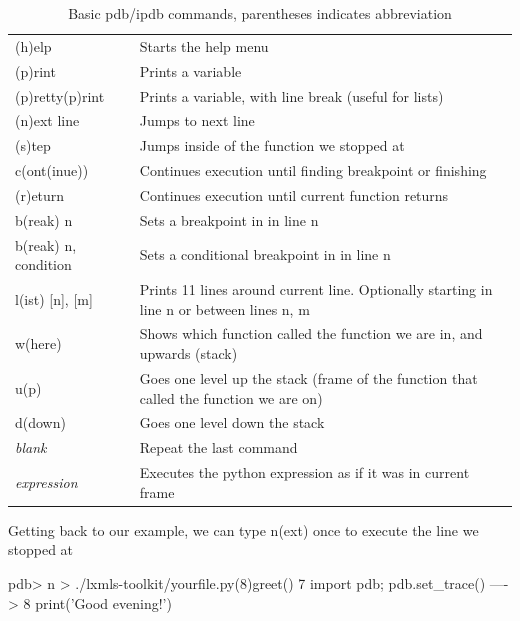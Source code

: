 \begin{table}[!h]
\begin{center}
\begin{tabular}{|l|l|}
\hline
(h)elp           & Starts the help menu\\
(p)rint          & Prints a variable\\
(p)retty(p)rint	 & Prints a variable, with line break (useful for lists)\\
\hline
(n)ext line      & Jumps to next line\\ 
(s)tep           & Jumps inside of the function we stopped at\\
c(ont(inue))     & Continues execution until finding breakpoint or finishing\\
(r)eturn         & Continues execution until current function returns\\
b(reak) n        & Sets a breakpoint in in line n\\
b(reak) n, condition  & Sets a conditional breakpoint in in line n\\
\hline
l(ist) [n], [m]  & Prints 11 lines around current line. Optionally starting in line n or between lines n, m\\
w(here)          & Shows which function called the function we are in, and upwards (stack)\\
u(p)             & Goes one level up the stack (frame of the function that called the function we are on)\\
d(down)          & Goes one level down the stack\\
\hline
\textit{blank}          & Repeat the last command\\ 
\textit{expression}     & Executes the python expression as if it was in current frame\\
\hline
\end{tabular}
\end{center}
\caption{\label{tb::pdbbasiccommands}Basic pdb/ipdb commands, parentheses indicates abbreviation}
\end{table}

\noindent Getting back to our example, we can type n(ext) once to execute the line we
stopped at

\begin{python}
pdb> n
> ./lxmls-toolkit/yourfile.py(8)greet()
      7                 import pdb; pdb.set_trace()
----> 8                 print('Good evening!') 
\end{python}

